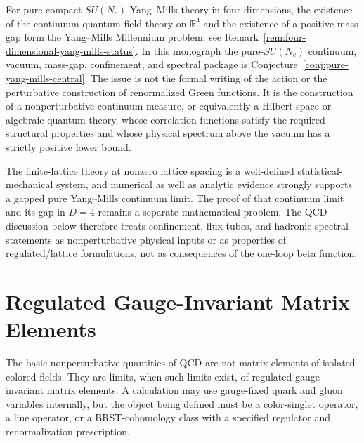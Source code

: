 \begin{remark}
\label{rem:qcd-mass-gap-status}
For pure compact \(SU(N_c)\) Yang--Mills theory in four dimensions, the
existence of the continuum quantum field theory on \(\mathbb R^4\) and the
existence of a positive mass gap form the Yang--Mills Millennium problem; see
Remark~\ref{rem:four-dimensional-yang-mills-status}.  In this monograph the
pure-\(SU(N_c)\) continuum, vacuum, mass-gap, confinement, and spectral package
is Conjecture~\ref{conj:pure-yang-mills-central}.  The issue is not the formal
writing of the action or the perturbative construction of renormalized Green
functions.  It is the construction of a nonperturbative continuum measure, or
equivalently a Hilbert-space or algebraic quantum theory, whose correlation
functions satisfy the required structural properties and whose physical
spectrum above the vacuum has a strictly positive lower bound.

The finite-lattice theory at nonzero lattice spacing is a well-defined
statistical-mechanical system, and numerical as well as analytic evidence
strongly supports a gapped pure Yang--Mills continuum limit.  The proof of
that continuum limit and its gap in \(D=4\) remains a separate mathematical
problem.  The QCD discussion below therefore treats confinement, flux tubes,
and hadronic spectral statements as nonperturbative physical inputs or as
properties of regulated/lattice formulations, not as consequences of the
one-loop beta function.
\end{remark}

\section{Regulated Gauge-Invariant Matrix Elements}
\label{sec:qcd-regulated-gauge-invariant-matrix-elements}

The basic nonperturbative quantities of QCD are not matrix elements of isolated
colored fields.  They are limits, when such limits exist, of regulated
gauge-invariant matrix elements.  A calculation may use gauge-fixed quark and
gluon variables internally, but the object being defined must be a
color-singlet operator, a line operator, or a BRST-cohomology class with a
specified regulator and renormalization prescription.

